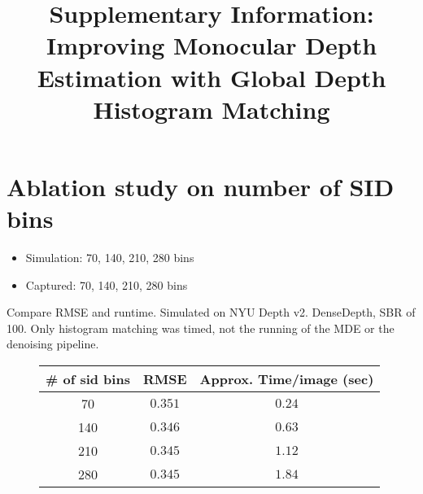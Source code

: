 \documentclass[10pt,letterpaper]{article}
\begin{document}
\title{Supplementary Information: Improving Monocular Depth Estimation with
  Global Depth Histogram Matching}

\maketitle
\section{Ablation study on number of SID bins}
\begin{itemize}
  \item Simulation: 70, 140, 210, 280 bins
  \item Captured: 70, 140, 210, 280 bins
\end{itemize}
Compare RMSE and runtime.
Simulated on NYU Depth v2. DenseDepth, SBR of 100. Only histogram matching
was timed, not the running of the MDE or the denoising pipeline.
\begin{figure}[H]
  \centering
  \begin{tabular}{c|cc}
    \toprule
    \# of sid bins & RMSE & Approx. Time/image (sec) \\
    \midrule
    70  & $0.351$ & $0.24$ \\
    140 & $0.346$ & $0.63$ \\
    210 & $0.345$ & $1.12$ \\
    280 & $0.345$ & $1.84$ \\
    \bottomrule
  \end{tabular}
\end{figure}
\end{document}
